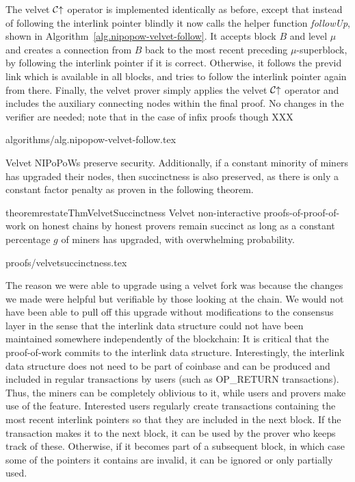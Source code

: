 The velvet $\mathcal{C}\negthickspace\uparrow$ operator
is implemented identically as before, except that instead of following the
interlink pointer blindly it now calls the helper function \textit{followUp},
shown in Algorithm~\ref{alg.nipopow-velvet-follow}. It accepts block $B$ and
level $\mu$ and creates a connection from $B$ back to the most recent preceding
$\mu$-superblock, by following the interlink pointer if it is correct.
Otherwise, it follows the previd link which is available in all blocks, and
tries to follow the interlink pointer again from there. Finally, the velvet
prover
simply applies the velvet $\mathcal{C}\negthickspace\uparrow$ operator and includes the auxiliary
connecting nodes within the final proof. No changes in the verifier are needed; note that in the case of infix proofs though XXX

{algorithms/alg.nipopow-velvet-follow.tex}

Velvet NIPoPoWs preserve security. Additionally, if a constant minority of
miners has upgraded their nodes, then succinctness is also preserved, as there
is only a constant factor penalty as proven in the following theorem.

\begin{restatable}{theorem}{restateThmVelvetSuccinctness}
    Velvet non-interactive proofs-of-proof-of-work on honest chains by honest
    provers remain succinct as long as a constant percentage $g$ of miners has
    upgraded, with overwhelming probability.
\end{restatable}

\ifonecolumn
{proofs/velvetsuccinctness.tex}
\fi

The reason we were able to upgrade using a velvet fork was because the changes
we made were helpful but verifiable by those looking at the chain. We would not
have been able to pull off this upgrade without modifications to the consensus
layer in the sense that the interlink data structure could not have been
maintained somewhere independently of the blockchain: It is critical that the
proof-of-work commits to the interlink data structure. Interestingly, the
interlink data structure does not need to be part of coinbase and can be
produced and included in regular transactions by users (such as OP\_RETURN
transactions). Thus, the miners can be completely oblivious to it, while users
and provers make use of the feature. Interested users regularly create
transactions containing the most recent interlink pointers so that they are
included in the next block. If the transaction makes it to the next block, it
can be used by the prover who keeps track of these. Otherwise, if it becomes
part of a subsequent block, in which case some of the pointers it contains are
invalid, it can be ignored or only partially used.

